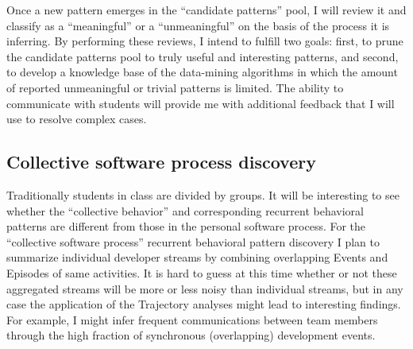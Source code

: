 Once a new pattern emerges in the ``candidate patterns'' pool, I will review it and classify as a ``meaningful'' or a ``unmeaningful'' on the basis of the process it is inferring. By performing these reviews, I intend to fulfill two goals: first, to prune the candidate patterns pool to truly useful and interesting patterns, and second, to develop a knowledge base of the data-mining algorithms in which the amount of reported unmeaningful or trivial patterns is limited. The ability to communicate with students will provide me with additional feedback that I will use to resolve complex cases.

\subsection{Collective software process discovery}
Traditionally students in class are divided by groups. It will be interesting to see whether the ``collective behavior'' and corresponding recurrent behavioral patterns are different from those in the personal software process. For the ``collective software process'' recurrent behavioral pattern discovery I plan to summarize individual developer streams by combining overlapping Events and Episodes of same activities. It is hard to guess at this time whether or not these aggregated streams will be more or less noisy than individual streams, but in any case the application of the Trajectory analyses might lead to interesting findings. For example, I might infer frequent communications between team members through the high fraction of synchronous (overlapping) development events.
